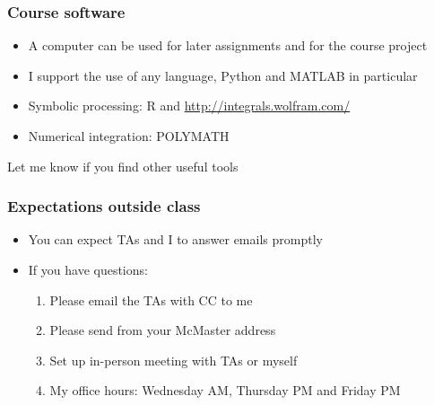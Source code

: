 \begin{frame}\frametitle{Course software}
	\begin{itemize}
		\item	A computer can be used for later assignments and for the course project 
		\item	I support the use of any language, Python and MATLAB in particular
		\item	Symbolic processing: R and {\small\href{http://integrals.wolfram.com/}{http://integrals.wolfram.com/}}
		\item	Numerical integration: POLYMATH
	\end{itemize}
	\vspace{12pt}
	Let me know if you find other useful tools
\end{frame}

\begin{frame}\frametitle{Expectations outside class}
	\begin{itemize}
		\item	You can expect TAs and I to answer emails promptly 
		\item	If you have questions: 
		\begin{enumerate}
			\item	Please email the TAs with CC to me \hfill {\tiny{\color{myOrange}{$\longleftarrow$ hopefully this solves your problem}}}
			\item	Please send from your McMaster address
			\item	Set up in-person meeting with TAs or myself 
			\item	My office hours: Wednesday AM, Thursday PM and Friday PM
		\end{enumerate}
	\end{itemize}
\end{frame}

